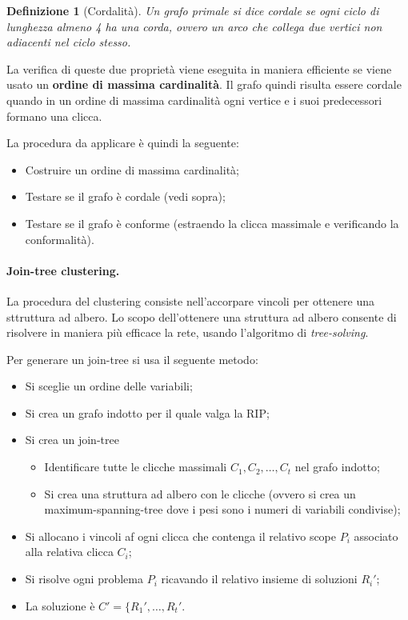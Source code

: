 \documentclass[a4paper, 11pt]{article}
\newtheorem{definit}{Definizione}[subsection]
\begin{document}
\begin{definit}[Cordalità]
	Un grafo primale si dice cordale se ogni ciclo di lunghezza almeno 4 ha una corda, ovvero un arco che collega due vertici non adiacenti nel ciclo stesso.
\end{definit}

La verifica di queste due proprietà viene eseguita in maniera efficiente se viene usato un \textbf{ordine di massima cardinalità}. Il grafo quindi risulta essere cordale quando in un ordine di massima cardinalità ogni vertice e i suoi predecessori formano una clicca. 

La procedura da applicare è quindi la seguente:\begin{itemize}
	\item Costruire un ordine di massima cardinalità;
	\item Testare se il grafo è cordale (vedi sopra);
	\item Testare se il grafo è conforme (estraendo la clicca massimale e verificando la conformalità).
\end{itemize}

\paragraph{Join-tree clustering.} La procedura del clustering consiste nell'accorpare vincoli per ottenere una sttruttura ad albero. Lo scopo dell'ottenere una struttura ad albero consente di risolvere in maniera più efficace la rete, usando l'algoritmo di \textit{tree-solving}.

Per generare un join-tree si usa il seguente metodo:
\begin{itemize}
	\item Si sceglie un ordine delle variabili;
	\item Si crea un grafo indotto per il quale valga la RIP;
	\item Si crea un join-tree \begin{itemize}
		\item Identificare tutte le clicche massimali $C_1, C_2, \dots, C_t$ nel grafo indotto;
		\item Si crea una struttura ad albero con le clicche (ovvero si crea un maximum-spanning-tree dove i pesi sono i numeri di variabili condivise);
	\end{itemize}
	\item Si allocano i vincoli af ogni clicca che contenga il relativo scope $P_i$ associato alla relativa clicca $C_i$;
	\item Si risolve ogni problema $P_i$ ricavando il relativo insieme di soluzioni $R_i'$;
	\item La soluzione è $C' = \lbrace R_1', \dots, R_t'$.
\end{itemize}
\end{document}
